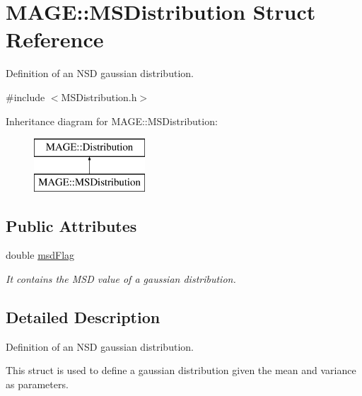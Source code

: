 \hypertarget{struct_m_a_g_e_1_1_m_s_distribution}{\section{M\-A\-G\-E\-:\-:M\-S\-Distribution Struct Reference}
\label{struct_m_a_g_e_1_1_m_s_distribution}
}


Definition of an N\-S\-D gaussian distribution.  




{\ttfamily \#include $<$M\-S\-Distribution.\-h$>$}

Inheritance diagram for M\-A\-G\-E\-:\-:M\-S\-Distribution\-:\begin{figure}[H]
\begin{center}
\leavevmode
\includegraphics[height=2.000000cm]{struct_m_a_g_e_1_1_m_s_distribution}
\end{center}
\end{figure}
\subsection*{Public Attributes}
\begin{DoxyCompactItemize}
\item 
\hypertarget{struct_m_a_g_e_1_1_m_s_distribution_a0ed9157691205923f9555223b473387a}{double \hyperlink{struct_m_a_g_e_1_1_m_s_distribution_a0ed9157691205923f9555223b473387a}{msd\-Flag}}\label{struct_m_a_g_e_1_1_m_s_distribution_a0ed9157691205923f9555223b473387a}

\begin{DoxyCompactList}\small\item\em It contains the M\-S\-D value of a gaussian distribution. \end{DoxyCompactList}\end{DoxyCompactItemize}


\subsection{Detailed Description}
Definition of an N\-S\-D gaussian distribution. 

This struct is used to define a gaussian distribution given the mean and variance as parameters.

